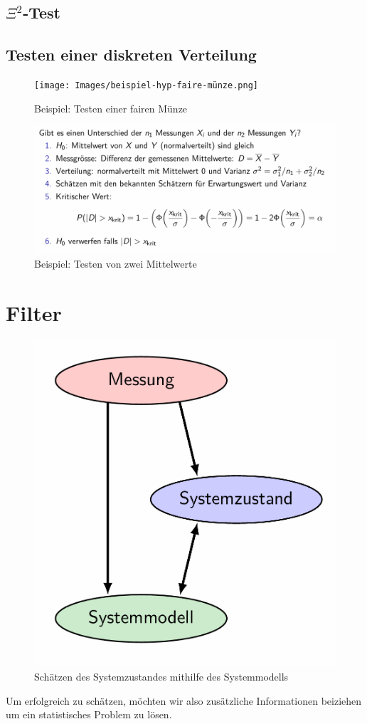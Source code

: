 \documentclass[../Main.tex]{subfiles}
\begin{document}
\subsection{\(\Xi^2\)-Test}
\subsection{Testen einer diskreten Verteilung}

\begin{figure}[H]
    \centering
    \texttt{[image: Images/beispiel-hyp-faire-münze.png]}
    \caption{Beispiel: Testen einer fairen Münze}
\end{figure}

\begin{figure}[H]
    \centering
    \includegraphics[width=1\linewidth]{Images/beispiel-hyp-mittelwert.png}
    \caption{Beispiel: Testen von zwei Mittelwerte}
\end{figure}

\section{Filter}

\begin{figure}[H]
    \centering
    \includegraphics[width=0.25\linewidth]{Images/schaetzen.png}
    \caption{Schätzen des Systemzustandes mithilfe des Systemmodells}
\end{figure}
Um erfolgreich zu schätzen, möchten wir also
zusätzliche Informationen beiziehen um ein
statistisches Problem zu lösen.
\end{document}
